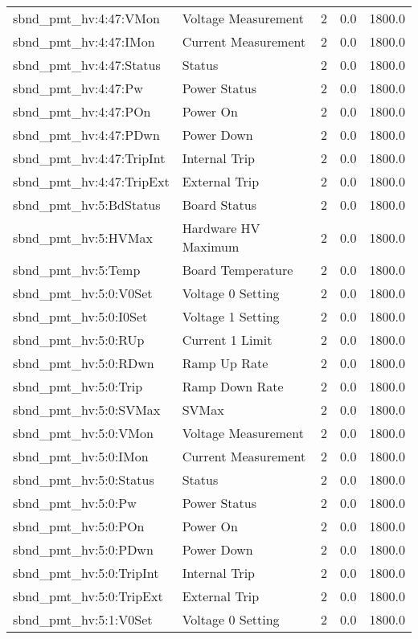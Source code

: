 \begin{center}
\begin{longtable}{l | l l l l }
sbnd\_pmt\_hv:4:47:VMon & Voltage Measurement & 2 & 0.0 & 1800.0\\ 
sbnd\_pmt\_hv:4:47:IMon & Current Measurement & 2 & 0.0 & 1800.0\\ 
sbnd\_pmt\_hv:4:47:Status & Status & 2 & 0.0 & 1800.0\\ 
sbnd\_pmt\_hv:4:47:Pw & Power Status & 2 & 0.0 & 1800.0\\ 
sbnd\_pmt\_hv:4:47:POn & Power On & 2 & 0.0 & 1800.0\\ 
sbnd\_pmt\_hv:4:47:PDwn & Power Down & 2 & 0.0 & 1800.0\\ 
sbnd\_pmt\_hv:4:47:TripInt & Internal Trip & 2 & 0.0 & 1800.0\\ 
sbnd\_pmt\_hv:4:47:TripExt & External Trip & 2 & 0.0 & 1800.0\\ 
sbnd\_pmt\_hv:5:BdStatus & Board Status & 2 & 0.0 & 1800.0\\ 
sbnd\_pmt\_hv:5:HVMax & Hardware HV Maximum & 2 & 0.0 & 1800.0\\ 
sbnd\_pmt\_hv:5:Temp & Board Temperature & 2 & 0.0 & 1800.0\\ 
sbnd\_pmt\_hv:5:0:V0Set & Voltage 0 Setting & 2 & 0.0 & 1800.0\\ 
sbnd\_pmt\_hv:5:0:I0Set & Voltage 1 Setting & 2 & 0.0 & 1800.0\\ 
sbnd\_pmt\_hv:5:0:RUp & Current 1 Limit & 2 & 0.0 & 1800.0\\ 
sbnd\_pmt\_hv:5:0:RDwn & Ramp Up Rate & 2 & 0.0 & 1800.0\\ 
sbnd\_pmt\_hv:5:0:Trip & Ramp Down Rate & 2 & 0.0 & 1800.0\\ 
sbnd\_pmt\_hv:5:0:SVMax & SVMax & 2 & 0.0 & 1800.0\\ 
sbnd\_pmt\_hv:5:0:VMon & Voltage Measurement & 2 & 0.0 & 1800.0\\ 
sbnd\_pmt\_hv:5:0:IMon & Current Measurement & 2 & 0.0 & 1800.0\\ 
sbnd\_pmt\_hv:5:0:Status & Status & 2 & 0.0 & 1800.0\\ 
sbnd\_pmt\_hv:5:0:Pw & Power Status & 2 & 0.0 & 1800.0\\ 
sbnd\_pmt\_hv:5:0:POn & Power On & 2 & 0.0 & 1800.0\\ 
sbnd\_pmt\_hv:5:0:PDwn & Power Down & 2 & 0.0 & 1800.0\\ 
sbnd\_pmt\_hv:5:0:TripInt & Internal Trip & 2 & 0.0 & 1800.0\\ 
sbnd\_pmt\_hv:5:0:TripExt & External Trip & 2 & 0.0 & 1800.0\\ 
sbnd\_pmt\_hv:5:1:V0Set & Voltage 0 Setting & 2 & 0.0 & 1800.0\\ 

\end{longtable}
\end{center}

